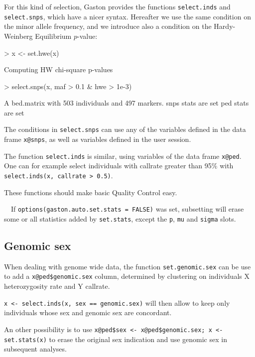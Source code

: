 \documentclass{article}
\renewenvironment{Schunk}{\vspace{\topsep}}{\vspace{\topsep}}
\begin{document}
  For this kind of selection, Gaston provides the functions \verb!select.inds! and 
  \verb!select.snps!, which have a nicer syntax. Hereafter 
  we use the same condition on the minor allele frequency, and we introduce also 
  a condition on the Hardy-Weinberg Equilibrium $p$-value:

\begin{Schunk}
\begin{Sinput}
> x <- set.hwe(x)
\end{Sinput}
\begin{Soutput}
Computing HW chi-square p-values
\end{Soutput}
\begin{Sinput}
> select.snps(x, maf > 0.1 & hwe > 1e-3)
\end{Sinput}
\begin{Soutput}
A bed.matrix with 503 individuals and 497 markers.
snps stats are set
ped stats are set
\end{Soutput}
\end{Schunk}
  The conditions in \verb!select.snps! can use any of the variables defined in the data frame \verb!x@snps!,
  as well as variables defined in the user session. 

  The function \verb!select.inds! is similar, using variables of the data frame \verb!x@ped!. 
  One can for example 
  select individuals with callrate greater than 95\% with \verb!select.inds(x, callrate > 0.5)!.

  These functions should make basic Quality Control easy. 

  \ \ If \verb!options(gaston.auto.set.stats = FALSE)!
  was set, subsetting will erase some or all statistics added by \verb!set.stats!,
  except the \verb!p!, \verb!mu! and \verb!sigma! slots. 

\subsection{Genomic sex}
  When dealing with genome wide data,
  the function \verb!set.genomic.sex! can be use to add a \verb!x@ped$genomic.sex! column,
  determined by clustering on individuals X heterozygosity rate and Y callrate.
 
  \verb!x <- select.inds(x, sex == genomic.sex)! will then allow to keep only individuals 
  whose sex and genomic sex are concordant.

  An other possibility is to use \verb!x@ped$sex <- x@ped$genomic.sex; x <- set.stats(x)! 
  to erase the original sex indication and use genomic sex in subsequent analyses.
\end{document}

